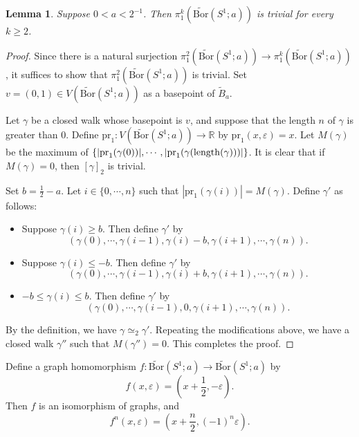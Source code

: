 \documentclass[11pt, amsfonts]{amsart}
\numberwithin{equation}{section}
\newtheorem{lemma}[thm]{Lemma}
\theoremstyle{definition}
\theoremstyle{remark}
\newcommand{\RR}{\mathbb{R}}
\newcommand{\tB}{\widetilde{B}}
\newcommand{\tBor}{\widetilde{\mathrm{Bor}}}
\newcommand{\pr}{\mathrm{pr}}
\begin{document}
\begin{lemma} \label{lemma simply-connected}
Suppose $0 < a < 2^{-1}$. Then $\pi_1^k(\tBor(S^1; a))$ is trivial for every $k \ge 2$.
\end{lemma}
\begin{proof}
Since there is a natural surjection $\pi_1^2(\tBor(S^1; a)) \to \pi_1^k(\tBor(S^1;a))$, it suffices to show that $\pi_1^2(\tBor(S^1; a))$ is trivial. Set $v = (0,1) \in V(\tBor(S^1; a))$ as a basepoint of $\tB_a$.

Let $\gamma$ be a closed walk whose basepoint is $v$, and suppose that the length $n$ of $\gamma$ is greater than $0$. Define $\pr_1 \colon V(\tBor(S^1; a)) \to \RR$ by $\pr_1(x, \varepsilon) = x$. Let $M(\gamma)$ be the maximum of $\{ |\pr_1(\gamma(0))|, \cdots, |\pr_1(\gamma({\rm length}(\gamma)))|\}$. It is clear that if $M(\gamma) = 0$, then $[\gamma]_2$ is trivial.

Set $b = \frac{1}{2} - a$. Let $i \in \{ 0, \cdots, n\}$ such that $|\pr_1(\gamma(i))| = M(\gamma)$. Define $\gamma'$ as follows:
\begin{itemize}
\item Suppose $\gamma(i) \ge b$. Then define $\gamma'$ by
\[ \left( \gamma(0), \cdots, \gamma(i-1), \gamma(i) - b, \gamma(i+1), \cdots, \gamma(n) \right).\]

\item Suppose $\gamma(i) \le -b$. Then define $\gamma'$ by
\[ \left( \gamma(0), \cdots, \gamma(i-1), \gamma(i) + b, \gamma(i+1), \cdots, \gamma(n)\right).\]

\item $-b \le \gamma(i) \le b$. Then define $\gamma'$ by
\[ \left(\gamma(0), \cdots, \gamma(i-1), 0, \gamma(i+1), \cdots, \gamma(n)\right).\]
\end{itemize}
By the definition, we have $\gamma \simeq_2 \gamma'$. Repeating the modifications above, we have a closed walk $\gamma''$ such that $M(\gamma'') = 0$. This completes the proof.
\end{proof}

Define a graph homomorphism $f \colon \tBor(S^1 ; a) \to \tBor(S^1 ; a)$ by
\[ f(x, \varepsilon) = \left(x + \frac{1}{2}, -\varepsilon\right).\]
Then $f$ is an isomorphism of graphs, and
\[ f^n(x, \varepsilon) = \left(x + \frac{n}{2}, (-1)^n \varepsilon\right).\]
\end{document}
